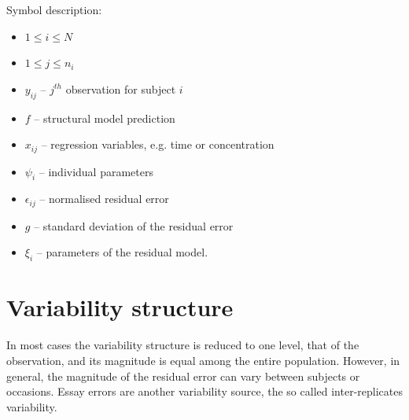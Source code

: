 Symbol description:
\begin{itemize}
\item	
$1\le i \le N$
\item
$1\le j \le n_i$
\item
$y_{ij}$ -- $j^{th}$ observation for subject $i$
\item
$f$ -- structural model prediction
\item
$x_{ij}$ -- regression variables, e.g. time or concentration
\item
$\psi_{i}$ -- individual parameters
\item
$\epsilon_{ij}$ -- normalised residual error
\item
$g$ -- standard deviation of the residual error
\item
$\xi_i$ -- parameters of the residual model.
\end{itemize}


%


\section{Variability structure}
\label{sec:variabStructure}
In most cases the variability structure is reduced to one level, that of the 
observation, and its magnitude is equal among the entire population. 
However, in general, the magnitude of the residual error can vary between 
subjects or occasions. Essay errors are another variability source, the  
so called inter-replicates variability.


